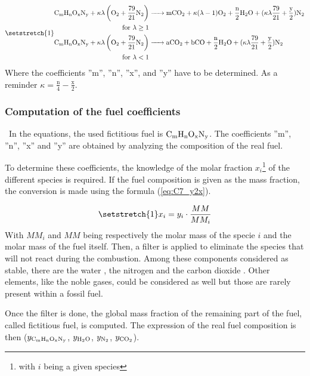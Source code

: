 \begin{subequations}
    \setstretch{1}
 \begin{align}
     \ce{C_{\text{m}}H_{\text{n}}O_{\text{x}}N_{\text{y}} +}\kappa\lambda \left(\ce{O2}+\frac{79}{21}\ce{N2}\right) &\ce{-> mCO2 +} \kappa(\lambda-1)\ce{O2 + \frac{n}{2}H2O +} (\kappa\lambda\frac{79}{21} + \frac{\text{y}}{2})\ce{N2}\\
     \text{ for \(\lambda\geq 1\)}\nonumber\\
     \ce{C_{\text{m}}H_{\text{n}}O_{\text{x}}N_{\text{y}} +}\kappa\lambda \left(\ce{O2}+\frac{79}{21}\ce{N2}\right) &\ce{-> aCO2 + bCO + \frac{n}{2}H2O} + (\kappa\lambda\frac{79}{21} + \frac{\text{y}}{2})\ce{N2}\\
     \text{ for \(\lambda< 1\)}\nonumber
 \end{align}
        \label{eq:C7_chemgeng01}
\end{subequations}
Where the coefficients ''m'', ''n'', ''x'', and ''y'' have to be determined. As a reminder $\kappa=\frac{\text{n}}{4}-\frac{\text{x}}{2}$. 

\subsubsection{Computation of the fuel coefficients}
\quad\ In the equations, the used fictitious fuel is $\ce{C_{\text{m}}H_{\text{n}}O_{\text{x}}N_{\text{y}}}$. The coefficients ''m'', ''n'', ''x'' and ''y'' are obtained by analyzing the composition of the real fuel.

To determine these coefficients, the knowledge of the molar fraction $x_i$\footnote{with $i$ being a given species} of the different species is required. If the fuel composition is given as the mass fraction, the conversion is made using the formula (\ref{eq:C7_y2x}).

\begin{equation}
\setstretch{1}
    x_i = y_i\cdot \frac{MM}{MM_i}\label{eq:C7_y2x}
\end{equation}
With $MM_i$ and $MM$ being respectively the molar mass of the specie $i$ and the molar mass of the fuel itself.
Then, a filter is applied to eliminate the species that will not react during the combustion. Among these components considered as stable, there are the water , the nitrogen  and the carbon dioxide . Other elements, like the noble gases, could be considered as well but those are rarely present within a fossil fuel.

Once the filter is done, the global mass fraction of the remaining part of the fuel, called fictitious fuel, is computed. The expression of the real fuel composition is then  ($y_{\ce{C_{\text{m}}H_{\text{n}}O_{\text{x}}N_{\text{y}}}}$, $y_{\ce{H2O}}$, $y_{\ce{N2}}$, $y_{\ce{CO2}}$).

